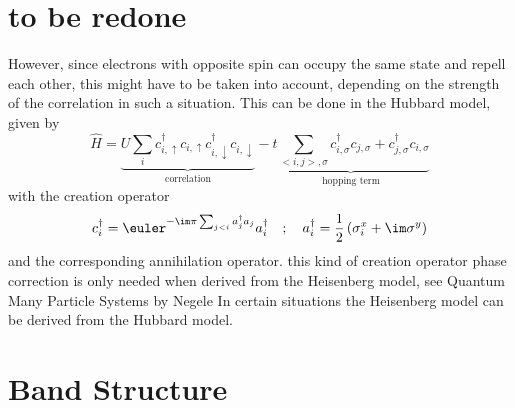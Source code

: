 \documentclass[a4paper,10pt]{report}
\begin{document}
\section{to be redone}

However, since electrons with opposite spin can occupy the same state and repell each other, this might have to be taken into account, depending on the 
strength of the correlation in such a situation. 
This can be done in the Hubbard model, given by
\begin{equation}
 \hat{H} = \underbrace{U \sum_i c^{\dagger}_{i,\uparrow}c_{i,\uparrow} c^{\dagger}_{i,\downarrow}c_{i,\downarrow} }_{\text{correlation}}
	    -\underbrace{t \sum_{<i,j>,\sigma} c^{\dagger}_{i,\sigma}c_{j,\sigma} + c^{\dagger}_{j,\sigma}c_{i,\sigma} }_{\text{hopping term}}
\end{equation}
with the creation operator 
\begin{equation}
 c^{\dagger}_{i} = \euler^{-\im\pi \sum_{j<i} a^{\dagger}_j a_j } a^{\dagger}_i\quad ; \quad a^{\dagger}_i = \frac12 \left( \sigma^x_i + \im \sigma^y \right)
\end{equation}
and the corresponding annihilation operator. 
 this kind of creation operator phase correction is only needed when derived from the Heisenberg model, see Quantum Many Particle Systems by Negele
In certain situations the Heisenberg model can be derived from the Hubbard model. 

\section{Band Structure}

\end{document}
